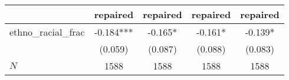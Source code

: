 {
\def\sym#1{\ifmmode^{#1}\else\(^{#1}\)\fi}
\begin{tabular}{l*{4}{c}}
\toprule
          &\multicolumn{1}{c}{repaired}&\multicolumn{1}{c}{repaired}&\multicolumn{1}{c}{repaired}&\multicolumn{1}{c}{repaired}\\
\midrule
ethno\_racial\_frac&   -0.184***&   -0.165*  &   -0.161*  &   -0.139*  \\
          &  (0.059)   &  (0.087)   &  (0.088)   &  (0.083)   \\
\midrule
\(N\)     &     1588   &     1588   &     1588   &     1588   \\
\bottomrule
\end{tabular}
}
